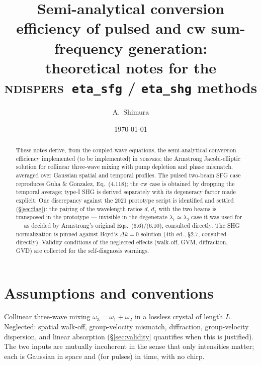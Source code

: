 \documentclass[aps,pra,preprint,amsmath,amssymb,nofootinbib,superscriptaddress]{revtex4-2}
\newcommand{\ndispers}{\textsc{ndispers}}
\begin{document}
\title{Semi-analytical conversion efficiency of pulsed and cw sum-frequency
generation:\\ theoretical notes for the \ndispers\ \texttt{eta\_sfg} /
\texttt{eta\_shg} methods}

\author{A.~Shimura}
\date{\today}

\begin{abstract}
These notes derive, from the coupled-wave equations, the semi-analytical
conversion efficiency implemented (to be implemented) in \ndispers: the
Armstrong Jacobi-elliptic solution for collinear three-wave mixing with pump
depletion and phase mismatch, averaged over Gaussian spatial and temporal
profiles. The pulsed two-beam SFG case reproduces
Guha \& Gonzalez, Eq.~(4.118); the cw case is obtained by dropping the
temporal average; type-I SHG is derived separately with its degeneracy
factor made explicit. One discrepancy against the 2021 prototype script is identified and
settled (\S\ref{sec:flag}): the pairing of the wavelength ratios $d$,
$d_1$ with the two beams is transposed in the prototype --- invisible in
the degenerate $\lambda_1\simeq\lambda_2$ case it was used for --- as
decided by Armstrong's original Eqs.~(6.6)/(6.10), consulted directly. The SHG normalization is
pinned against Boyd's $\Delta k=0$ solution (4th ed., \S2.7, consulted
directly). Validity conditions
of the neglected effects (walk-off, GVM, diffraction, GVD) are collected for
the self-diagnosis warnings.
\end{abstract}

\maketitle

\section{Assumptions and conventions}\label{sec:conv}

Collinear three-wave mixing $\omega_3=\omega_1+\omega_2$ in a lossless
crystal of length $L$. Neglected: spatial walk-off, group-velocity mismatch,
diffraction, group-velocity dispersion, and linear absorption
(\S\ref{sec:validity} quantifies when this is justified). The two inputs are
mutually incoherent in the sense that only intensities matter; each is
Gaussian in space and (for pulses) in time, with no chirp.
\end{document}
